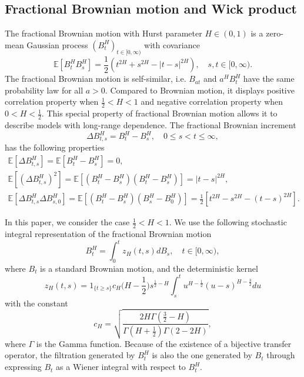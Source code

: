 \documentclass[reqno]{amsart}
\begin{document}
\subsection{Fractional Brownian motion and Wick product}
The fractional Brownian motion with Hurst parameter $H\in\left( 0,1\right) $ is 
a zero-mean Gaussian process $\left ( B_{t}^{H} \right )_{t \in [0,\infty)} $ with
 covariance
\[
\mathbb{E}\left[B_{t}^{H} B_{s}^{H}\right]=\frac{1}{2}\left(t^{2 H}+s^{2 H}
-|t-s|^{2 H}\right), \quad s,t \in [0,\infty).
\]
The fractional Brownian motion is self-similar, i.e. $ B_{at} $ and 
$a^{H} B_{t}^{H}$ have the same probability law for all $a>0$. Compared to 
Brownian motion, it displays positive correlation property when $\frac{1}{2}<H<1$
and negative correlation property when $0<H<\frac{1}{2}$. This special property 
of fractional Brownian motion allows it to describe models with long-range dependence. The fractional Brownian increment
\[
 \Delta B_{t, s}^H=B_t^H-B_s^H, \quad 0\leq s<t \leq\infty,
\]
has the following properties
\begin{gather*}
\mathbb{E}\left[\Delta B_{t, s}^H\right]
=\mathbb{E}\left[B_t^H-B_s^H\right]=0,\\
\mathbb{E}\left[\left(\Delta B_{t, s}^H\right)^2\right]
=\mathbb{E}\left[\left(B_t^H-B_s^H\right)\left(B_t^H-B_s^H\right)\right]=|t-s|^{2 H} ,\\
\mathbb{E}\left[\Delta B_{t, s}^H \Delta B_{s, 0}^H\right]
=\mathbb{E}\left[\left(B_t^H-B_s^H\right)\left(B_s^H-B_0^H\right)\right] =\frac{1}{2}\left[t^{2 H}-s^{2 H}-(t-s)^{2 H}\right] .
\end{gather*}

In this paper, we consider the case $\frac{1}{2}<H<1$. We use the following 
stochastic integral representation of the fractional Brownian motion
\[
B_t^H=\int_0^t z_H(t, s) d B_s, \quad t \in [0,\infty),
\]
where $B_{t} $ is a standard Brownian motion, and the deterministic kernel
\[
 z_H(t, s)=1_{\{t \geq s\}} c_H\big(H-\frac{1}{2}\big) s^{\frac{1}{2}-H} 
 \int_s^t u^{H-\frac{1}{2}}(u-s)^{H-\frac{3}{2}} d u
\]
with the constant
\[
c_H=\sqrt{\frac{2 H \Gamma\left(\frac{3}{2}-H\right)}{\Gamma\left(H+\frac{1}{2}\right) 
\Gamma(2-2 H)}} ,
\]
where $\Gamma$ is the Gamma function. Because of the existence of a bijective transfer 
operator, the filtration generated by $B_{t}^{H}$ is also the one generated by 
$B_{t}$ through expressing $B_{t}$ as a Wiener integral with respect to $B_{t}^{H}$.
\end{document}
